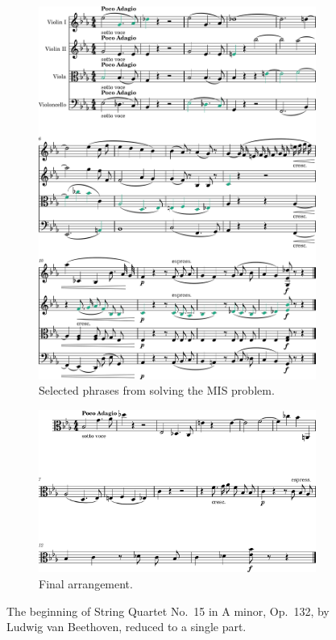 \documentclass[aps,pra,10pt,twocolumn]{revtex4-2}
\begin{document}
\begin{figure}[h]
\begin{subfigure}[b]{0.48\linewidth}
        \includegraphics[width=\linewidth]{../Figures/selected-1.png}
        \caption{Selected phrases from solving the MIS problem.}
        \label{fig:selected}
    \end{subfigure}
    \par\bigskip
    \begin{subfigure}[t]{0.5\linewidth}
        \centering
        \includegraphics[width=\linewidth]{../Figures/arrangement-1.png}
        \caption{Final arrangement.}
        \label{fig:arrangement}
    \end{subfigure}
    \caption{The beginning of String Quartet No.\ 15 in A minor, Op.\ 132, by Ludwig van Beethoven, reduced to a single part.}
    \label{fig:results}
\end{figure}
\end{document}
